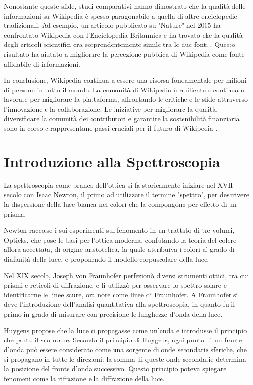 \documentclass[12pt,a4paper]{report}
\begin{document}
Nonostante queste sfide, studi comparativi hanno dimostrato che la qualità delle informazioni su Wikipedia è spesso paragonabile a quella di altre enciclopedie tradizionali. Ad esempio, un articolo pubblicato su "Nature" nel 2005 ha confrontato Wikipedia con l'Enciclopedia Britannica e ha trovato che la qualità degli articoli scientifici era sorprendentemente simile tra le due fonti \cite{giles2005nature}. Questo risultato ha aiutato a migliorare la percezione pubblica di Wikipedia come fonte affidabile di informazioni.

In conclusione, Wikipedia continua a essere una risorsa fondamentale per milioni di persone in tutto il mondo. La comunità di Wikipedia è resiliente e continua a lavorare per migliorare la piattaforma, affrontando le critiche e le sfide attraverso l'innovazione e la collaborazione. Le iniziative per migliorare la qualità, diversificare la comunità dei contributori e garantire la sostenibilità finanziaria sono in corso e rappresentano passi cruciali per il futuro di Wikipedia \cite{reagle2010good}.

\chapter{Introduzione alla Spettroscopia}

La spettroscopia come branca dell'ottica si fa storicamente iniziare nel XVII secolo con Isaac Newton, il primo ad utilizzare il termine "spettro", per descrivere la dispersione della luce bianca nei colori che la compongono per effetto di un prisma\cite{Newton1671}.

Newton raccolse i sui esperimenti sul fenomento in un trattato di tre volumi, Opticks\cite{newton1704opticks}, che pose le basi per l'ottica moderna, confutando la teoria del colore allora accettata, di origine aristotelica, la quale attribuiva i colori al grado di diafanità della luce\cite{boscarol2024}, e proponendo il modello corpuscolare della luce.

Nel XIX secolo, Joseph von Fraunhofer perfezionò diversi strumenti ottici, tra cui prismi e reticoli di diffrazione, e li utilizzò per osservare lo spettro solare e identificarne le linee scure, ora note come linee di Fraunhofer\cite{Fraunhofer1817}. A Fraunhofer si deve l'introduzione dell'analisi quantitativa alla spettroscopia, in quanto fu il primo in grado di misurare con precisione le lunghezze d'onda della luce.

Huygens propose che la luce si propagasse come un'onda e introdusse il principio che porta il suo nome\cite{Huygens1690}. Secondo il principio di Huygens, ogni punto di un fronte d'onda può essere considerato come una sorgente di onde secondarie sferiche, che si propagano in tutte le direzioni; la somma di queste onde secondarie determina la posizione del fronte d'onda successivo. Questo principio poteva spiegare fenomeni come la rifrazione e la diffrazione della luce.
\end{document}
